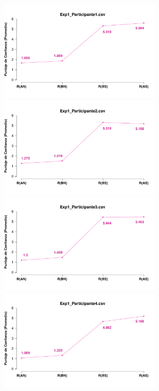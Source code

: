 \documentclass[a4paper ]{article}
\begin{document}
\begin{figure}[th]
\centering
\includegraphics[width=9cm, height=5cm]{Figures/MirrorRating_Exp1_P1} \includegraphics[width=9cm, height=5cm]{Figures/MirrorRating_Exp1_P2} 
\includegraphics[width=9cm, height=5cm]{Figures/MirrorRating_Exp1_P3} \includegraphics[width=9cm, height=5cm]{Figures/MirrorRating_Exp1_P4} 

\end{figure}
\end{document}
